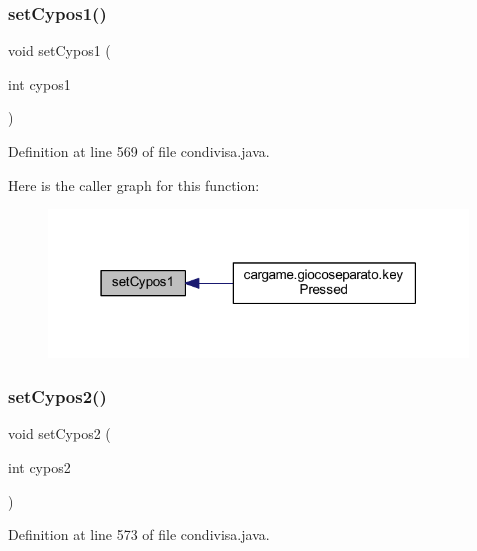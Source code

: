 \subsubsection{\texorpdfstring{set\+Cypos1()}{setCypos1()}}
{\footnotesize\ttfamily void set\+Cypos1 (\begin{DoxyParamCaption}\item[{int}]{cypos1 }\end{DoxyParamCaption})}



Definition at line 569 of file condivisa.\+java.

Here is the caller graph for this function\+:
\nopagebreak
\begin{figure}[H]
\begin{center}
\leavevmode
\includegraphics[width=316pt]{classcargame_1_1condivisa_a055bf748dacc07464a59c719b61403e4_icgraph}
\end{center}
\end{figure}
\mbox{\label{classcargame_1_1condivisa_acdb37b1eabbd63bf181251992fddbcfe}} 
\subsubsection{\texorpdfstring{set\+Cypos2()}{setCypos2()}}
{\footnotesize\ttfamily void set\+Cypos2 (\begin{DoxyParamCaption}\item[{int}]{cypos2 }\end{DoxyParamCaption})}



Definition at line 573 of file condivisa.\+java.

